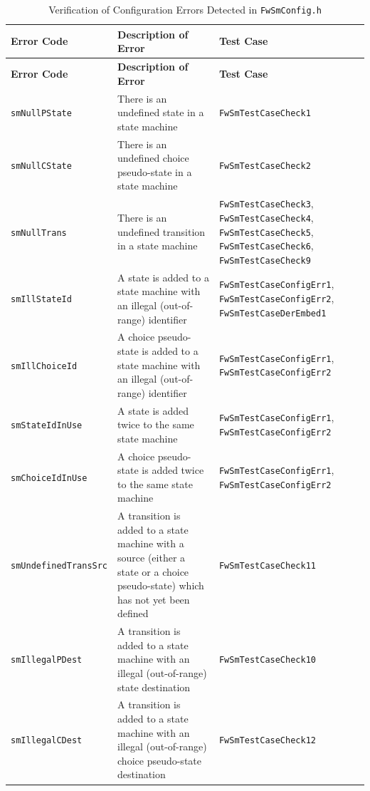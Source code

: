 \documentclass[requirements]{../fwprofile}
\begin{document}
\begin{longtable}{|p{3cm}|p{3.7cm}|p{4.5cm}|}
\caption{Verification of Configuration Errors Detected in \texttt{FwSmConfig.h}} \label{tab:SM_Config_Error}\\
\hline
\rowcolor{gray}
\textbf{Error Code} & \textbf{Description of Error} & \textbf{Test Case} \\
\hline
\endfirsthead
\rowcolor{gray}
\textbf{Error Code} & \textbf{Description of Error} & \textbf{Test Case} \\
\hline
\endhead
\texttt{smNullPState} & There is an undefined state in a state machine & 
\texttt{FwSmTestCaseCheck1} \\
\hline
\texttt{smNullCState} & There is an undefined choice pseudo-state in a state machine & \texttt{FwSmTestCaseCheck2} \\
\hline
\texttt{smNullTrans} & There is an undefined transition in a state machine & \texttt{FwSmTestCaseCheck3}, \texttt{FwSmTestCaseCheck4}, 
\texttt{FwSmTestCaseCheck5}, \texttt{FwSmTestCaseCheck6}, \texttt{FwSmTestCaseCheck9} \\
\hline
\texttt{smIllStateId} & A state is added to a state machine with an illegal (out-of-range) identifier & \texttt{FwSmTestCaseConfigErr1}, 
\texttt{FwSmTestCaseConfigErr2}, \texttt{FwSmTestCaseDerEmbed1} \\
\hline
\texttt{smIllChoiceId} & A choice pseudo-state is added to a state machine with an illegal (out-of-range) identifier & \texttt{FwSmTestCaseConfigErr1}, 
\texttt{FwSmTestCaseConfigErr2} \\
\hline
\texttt{smStateIdInUse} & A state is added twice to the same state machine & \texttt{FwSmTestCaseConfigErr1}, \texttt{FwSmTestCaseConfigErr2} \\
\hline
\texttt{smChoiceIdInUse} & A choice pseudo-state is added twice to the same state machine & \texttt{FwSmTestCaseConfigErr1}, \texttt{FwSmTestCaseConfigErr2} \\
\hline
\texttt{smUndefinedTransSrc} & A transition is added to a state machine with a source (either a state or a choice pseudo-state) 
which has not yet been defined & \texttt{FwSmTestCaseCheck11} \\
\hline
\texttt{smIllegalPDest} & A transition is added to a state machine with an illegal (out-of-range) state destination & \texttt{FwSmTestCaseCheck10} \\
\hline
\texttt{smIllegalCDest} & A transition is added to a state machine with an illegal (out-of-range) choice pseudo-state destination & \texttt{FwSmTestCaseCheck12} \\

\end{longtable}
\end{document}
